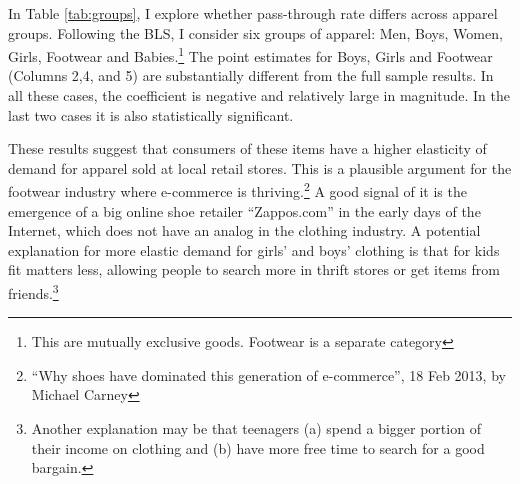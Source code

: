 \documentclass[12pt]{article}
\begin{document}
	  In Table \ref{tab:groups}, I explore whether pass-through rate differs across apparel groups. Following the BLS, I consider six groups of apparel: Men, Boys, Women, Girls, Footwear and Babies.\footnote{This are mutually exclusive goods. Footwear is a separate category} The point estimates for Boys, Girls and Footwear (Columns 2,4, and 5) are substantially different from the full sample results. In all these cases, the coefficient is negative and relatively large in magnitude. In the last two cases it is also statistically significant.
	
	These results suggest that consumers of these items have a higher elasticity of demand for apparel sold at local retail stores. This is a plausible argument for the footwear industry where e-commerce is thriving.\footnote{``Why shoes have dominated this generation of e-commerce'', 18 Feb 2013, by Michael Carney} A good signal of it is the emergence of a big online shoe retailer ``Zappos.com'' in the early days of the Internet, which does not have an analog in the clothing industry. A potential explanation for more elastic demand for girls' and boys' clothing is that for kids fit matters less, allowing people to search more in thrift stores or get items from friends.\footnote{Another explanation may be that teenagers (a) spend a bigger portion of their income on clothing and (b) have more free time to search for a good bargain.}
	
\end{document}
